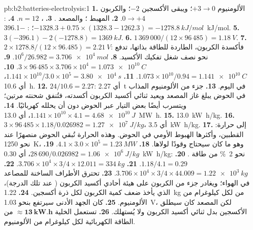 \begin{solution}{pb:b2:batteries-electrolysis:1}
\textbf{1.} الألومنيوم $+3 \to 0$؛ ويبقى الأكسجين $-2$؛ والكربون $0 \to +4$.
\textbf{2.} المهبط ؛ والمصعد .
\textbf{3.} ، $n = 12$.
\textbf{4.} : $-1328.3 + 0.75 \times (1328.3 - 1262.3) = \qty{-1278.8}{kJ/mol}$؛
: \qty{-396.1}{kJ/mol}.
\textbf{5.} $3(-396.1) - 2(-1278.8) = \qty{+1369}{kJ}$.
\textbf{6.} $1\,369\,000/(12 \times 96\,485) = \qty{1.18}{V}$.
\textbf{7.} $2 \times 1278.8/(12 \times 96.485) = \qty{2.21}{V}$: فأكسدة الكربون،
الطاردة للطاقة بذاتها، تدفع نحو نصف شغل تفكيك الأكسيد.
\textbf{8.} $10^6/26.982 = \qty{3.706e4}{mol}$.
\textbf{9.} $3 \times 96\,485 \times 3.706 \times 10^4 = \qty{1.073e10}{C}$.
\textbf{10.} $1.073 \times 10^{10}/0.94 = \qty{1.141e10}{C}$.
\textbf{11.} $1.141 \times 10^{10}/3.0 \times 10^5 = \qty{3.80e4}{s}$، أي \qty{10.6}{h}.
\textbf{12.} $24/10.6 = 2.27$: أي \qty{2.27}{t} في اليوم.
\textbf{13.} جزء من الألومنيوم المذاب في الحوض يبلغ غاز المصعد
ويعيد ثنائي أكسيد الكربون أكسدته، فتُنفق شحنته مرتين؛ ويتسرب أيضًا بعض
التيار عبر الحوض دون أن يحلله كهربائيًا.
\textbf{14.} $1.141 \times 10^{10} \times 4.1 = \qty{4.68e10}{J}$، أي \qty{13.0}{MW.h}.
\textbf{15.} \qty{13.0}{kW.h/kg}.
\textbf{16.} $3 \times 96\,485 \times 1.18/0.026982 = \qty{1.27e7}{J/kg}$، أي \qty{3.5}{kW.h/kg}.
\textbf{17.} إلى حرارة:  القطبين، وأكثرها الهبوط
الأومي في الحوض. وهذه الحرارة تُبقي الحوض منصهرًا عند نحو
\qty{1250}{K}، وهو ما كان سيحتاج وقودًا لولاها.
\textbf{18.} $4.1 \times 3.0 \times 10^5 = \qty{1.23}{MW}$.
\textbf{19.} $28\,690/0.026982 = \qty{1.06e6}{J/kg}$، أي \qty{0.30}{kW.h/kg}: نحو 2~\% من
طاقة .
\textbf{20.} $1.18/4.1 = 0.29$.
\textbf{21.} $3.706 \times 10^4 \times 3/4 \times 12.011 = \qty{334}{kg}$.
\textbf{22.} $3.706 \times 10^4 \times 3/4 \times 44.009 = \qty{1.22e3}{kg}$.
\textbf{23.} تحترق الأطراف الساخنة للمصاعد في الهواء؛ ويغادر جزء من الكربون
على هيئة أحادي أكسيد الكربون ( عند تلك الدرجة)، الذي يأخذ ضعف
كمية الكربون لكل ذرة أكسجين.
\textbf{24.} \qty{1.22}{kg} من  لكل كيلوغرام من الألومنيوم.
\textbf{25.} كان الجهد الأدنى سيرتفع بنحو \qty{1.03}{V}، لكن المصعد
كان سيطلق الأكسجين بدل ثنائي أكسيد الكربون ولا يُستهلك.
\textbf{26.} تستعمل الخلية $\boldsymbol{\approx \qty{13}{kW.h}}$ من الطاقة
الكهربائية لكل كيلوغرام من الألومنيوم.
\end{solution}
